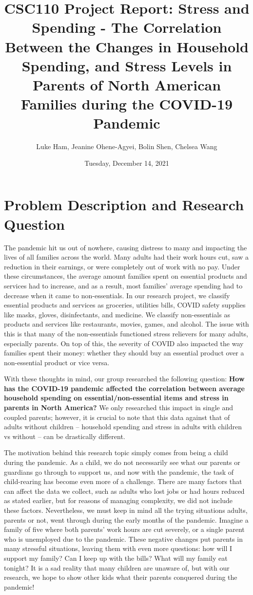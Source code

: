 \documentclass[fontsize=11pt]{article}
\title{CSC110 Project Report: Stress and Spending - The Correlation Between the Changes in Household Spending, and Stress Levels in Parents of North American Families during the COVID-19 Pandemic}
\author{Luke Ham, Jeanine Ohene-Agyei, Bolin Shen, Chelsea Wang}
\date{Tuesday, December 14, 2021}
\begin{document}
    \maketitle


    \section*{Problem Description and Research Question}

    The pandemic hit us out of nowhere, causing distress to many and impacting the lives of all families across the world. Many adults had their work hours cut, saw a reduction in their earnings, or were completely out of work with no pay. Under these circumstances, the average amount families spent on essential products and services had to increase, and as a result, most families’ average spending had to decrease when it came to non-essentials. In our research project, we classify essential products and services as groceries, utilities bills, COVID safety supplies like masks, gloves, disinfectants, and medicine. We classify non-essentials as products and services like restaurants, movies, games, and alcohol. The issue with this is that many of the non-essentials functioned stress relievers for many adults, especially parents. On top of this, the severity of COVID also impacted the way families spent their money: whether they should buy an essential product over a non-essential product or vice versa.

    With these thoughts in mind, our group researched the following question: \textbf{How has the COVID-19 pandemic affected the correlation between average household spending on essential/non-essential items and stress in parents in North America?} We only researched this impact in single and coupled parents; however, it is crucial to note that this data against that of adults without children -- household spending and stress in adults with children vs without -- can be drastically different.

    The motivation behind this research topic simply comes from being a child during the pandemic. As a child, we do not necessarily see what our parents or guardians go through to support us, and now with the pandemic, the task of child-rearing has become even more of a challenge. There are many factors that can affect the data we collect, such as adults who lost jobs or had hours reduced as stated earlier, but for reasons of managing complexity, we did not include these factors. Nevertheless, we must keep in mind all the trying situations adults, parents or not, went through during the early months of the pandemic. Imagine a family of five where both parents’ work hours are cut severely, or a single parent who is unemployed due to the pandemic. These negative changes put parents in many stressful situations, leaving them with even more questions: how will I support my family? Can I keep up with the bills? What will my family eat tonight? It is a sad reality that many children are unaware of, but with our research, we hope to show other kids what their parents conquered during the pandemic!
\end{document}
